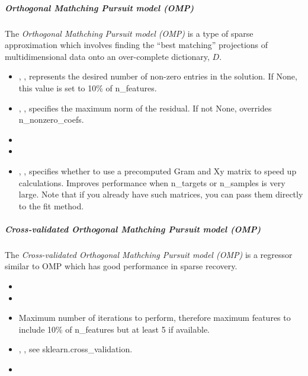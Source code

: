 \subparagraph{Orthogonal Mathching Pursuit model (OMP)}
\mbox{}

The \textit{Orthogonal Mathching Pursuit model (OMP)} is a type of sparse
approximation which involves finding the ``best matching'' projections of
multidimensional data onto an over-complete dictionary, $D$.
%
\begin{itemize}
  \item {}, , represents
  the desired number of non-zero entries in the solution.
  If None, this value is set to 10\% of n\_features.
  \item {}, , specifies the maximum
  norm of the residual.
  If not None, overrides n\_nonzero\_coefs.
  \item {}
  \item {}
  \item {}, , specifies
  whether to use a precomputed Gram and Xy matrix to speed up calculations.
  Improves performance when n\_targets or n\_samples is very large.
  Note that if you already have such matrices, you can pass them directly to the
  fit method.
\end{itemize}

\subparagraph{Cross-validated Orthogonal Mathching Pursuit model (OMP)}
\mbox{}

The \textit{Cross-validated Orthogonal Mathching Pursuit model (OMP)} is a
regressor similar to OMP which has good performance in sparse recovery.
%
\begin{itemize}
  \item {}
  \item {}
  \item \maxIterDescription{}
  Maximum number of iterations to perform, therefore maximum features to
  include 10\% of n\_features but at least 5 if available.
  \item {}, ,
  see sklearn.cross\_validation.
  \item \verDescriptionB
\end{itemize}

